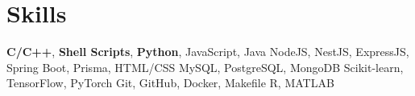 \section{\textbf{Skills}}
\vspace{-0.4mm}
 \resumeHeadingSkillStart
    {\textbf{C/C++}, \textbf{Shell Scripts}, \textbf{Python}, JavaScript, Java}
    {NodeJS, NestJS, ExpressJS, Spring Boot, Prisma, HTML/CSS}
    {MySQL, PostgreSQL, MongoDB}
    {Scikit-learn, TensorFlow, PyTorch}
    {Git, GitHub, Docker, Makefile}
    {R, MATLAB}
 \resumeHeadingSkillEnd
 
\vspace{-6mm}
 